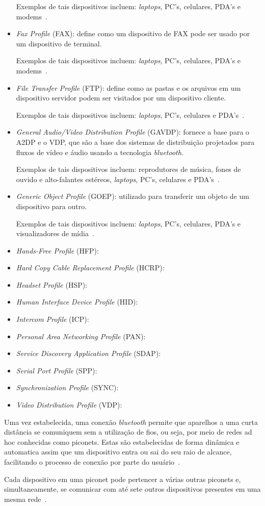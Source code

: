 \begin{itemize}
	Exemplos de tais dispositivos incluem: \emph{laptops}, PC's, celulares, PDA's e modems~\cite{bluetoothprofilesDUN}.
	\item \emph{Fax Profile} (FAX): define como um dispositivo de FAX pode ser usado por um dispositivo de terminal.

	Exemplos de tais dispositivos incluem: \emph{laptops}, PC's, celulares, PDA's e modems~\cite{bluetoothprofilesFAX}.
	\item \emph{File Transfer Profile} (FTP): define como as pastas e os arquivos em um dispositivo servidor podem ser visitados por um dispositivo cliente.

	Exemplos de tais dispositivos incluem: \emph{laptops}, PC's, celulares e PDA's~\cite{bluetoothprofilesFTP}.
	\item \emph{General Audio/Video Distribution Profile} (GAVDP): fornece a base para o A2DP e o VDP, que são a base dos sistemas de distribuição projetados para fluxos de vídeo e áudio usando a tecnologia \emph{bluetooth}.

	Exemplos de tais dispositivos incluem: reprodutores de música, fones de ouvido e alto-falantes estéreos, \emph{laptops}, PC's, celulares e PDA's~\cite{bluetoothprofilesGAVDP}.
	\item \emph{Generic Object Profile} (GOEP): utilizado para transferir um objeto de um dispositivo para outro.

	Exemplos de tais dispositivos incluem: \emph{laptops}, PC's, celulares, PDA's e visualizadores de mídia~\cite{bluetoothprofilesGOEP}.
	\item \emph{Hands-Free Profile} (HFP): 
	\item \emph{Hard Copy Cable Replacement Profile} (HCRP): 
	\item \emph{Headset Profile} (HSP): 
	\item \emph{Human Interface Device Profile} (HID): 
	\item \emph{Intercom Profile} (ICP): 
	\item \emph{Personal Area Networking Profile} (PAN): 
	\item \emph{Service Discovery Application Profile} (SDAP): 
	\item \emph{Serial Port Profile} (SPP): 
	\item \emph{Synchronization Profile} (SYNC): 
	\item \emph{Video Distribution Profile} (VDP): 
\end{itemize}

Uma vez estabelecida, uma conexão \emph{bluetooth} permite que aparelhos a uma curta distância se comuniquem sem a utilização de fios, ou seja, por meio de redes ad hoc conhecidas como piconets. Estas são estabelecidas de forma dinâmica e automatica assim que um dispositivo entra ou sai do seu raio de alcance, facilitando o processo de conexão por parte do usuário~\cite{bluetoothoverview}.

Cada dispositivo em uma piconet pode pertencer a várias outras piconets e, simultaneamente, se comunicar com até sete outros dispositivos presentes em uma mesma rede~\cite{bluetoothoverview}.

